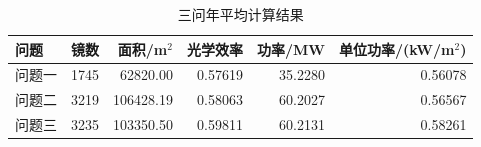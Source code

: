 \begin{table}[H]\centering\small
\caption{三问年平均计算结果}\label{tab:annual}
\begin{tabular}{lrrrrr}\toprule
问题 & 镜数 & 面积/m$^2$ & 光学效率 & 功率/MW & 单位功率/(kW/m$^2$)\\\midrule
问题一 & 1745 & 62820.00 & 0.57619 & 35.2280 & 0.56078\\
问题二 & 3219 & 106428.19 & 0.58063 & 60.2027 & 0.56567\\
问题三 & 3235 & 103350.50 & 0.59811 & 60.2131 & 0.58261\\
\bottomrule\end{tabular}
\end{table}
